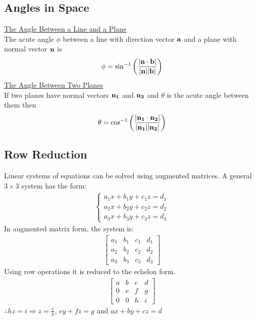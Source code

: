 \documentclass[10pt, a4paper, titlepage]{article}
\begin{document}
\begin{multicols*}{3}
	\subsection{Angles in Space}
	\underline{The Angle Between a Line and a Plane}\\
	The acute angle $\phi$ between a line with direction vector $\vb{a}$ and a plane with normal vector $\vb{n}$ is
	\begin{align}
		\phi=\sin^{-1}{\left(\frac{|\vb{n}\cdot\vb{b}|}{|\vb{n}||\vb{b}|}\right)}
	\end{align}
	\underline{The Angle Between Two Planes}\\
	If two planes have normal vectors $\vb{n_1}$ and $\vb{n_2}$ and $\theta$ is the acute angle between them then
	\begin{align}
		\theta=\cos^{-1}{\left(\frac{|\vb{n_1}\cdot\vb{n_2}|}{|\vb{n_1}||\vb{n_2}|}\right)}
	\end{align}

	\dotfill
	\subsection{Row Reduction}
	Linear systems of equations can be solved using augmented matrices. A general $3\times 3$ system has the form:
	\begin{align}
		\begin{cases}
			a_1x+b_1y+c_1z=d_1\\
			a_2x+b_2y+c_2z=d_2\\
			a_3x+b_3y+c_3z=d_3
		\end{cases}
	\end{align}
	In augmented matrix form, the system is:
	\begin{align}
		\left[
			\begin{array}{ccc|c}
				a_1 & b_1 & c_1 & d_1\\
				a_2 & b_2 & c_2 & d_2\\
				a_3 & b_3 & c_3 & d_3
			\end{array}
		\right]
	\end{align}
	Using row operations it is reduced to the echelon form.
	\begin{align}
		\left[
			\begin{array}{ccc|c}
				a & b & c & d\\
				0 & e & f & g\\
				0 & 0 & h & i
			\end{array}
		\right]
	\end{align}
	$\therefore hz=i\Rightarrow z=\frac{i}{h}$, $ey+fz=g$ and $ax+by+cz=d$


\end{multicols*}
\end{document}
